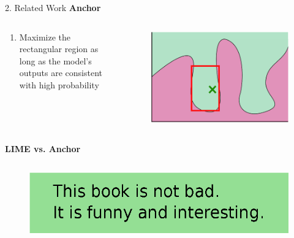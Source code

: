 \documentclass[unicode]{beamer}
\begin{document}
\begin{frame}
\begin{columns}[t]
\begin{column}{\lcol\linewidth}
\begin{block}{2. Related Work}
				\vspace{1.0em}
				\hspace{-1.0em}
				\textbf{Anchor}\cite{ribeiro2018anchors}
				\vspace{-0.5em}
				\begin{columns}
					\begin{column}{.55\textwidth}
						{
							\renewcommand{\leftmargini}{2.5em}
							\begin{enumerate}
								\item Maximize the rectangular region as long as
								      the model’s outputs are consistent with high probability
							\end{enumerate}
						}
					\end{column}
					\begin{column}{.45\textwidth}
						\begin{figure}
							\centering
							\includegraphics[width=.8\textwidth]{src/img/visual-anchor}
						\end{figure}
					\end{column}
				\end{columns}
				\vspace{1.0em}
				\hspace{-1.0em}
				\textbf{LIME vs. Anchor}
				\vspace{0.5em}
				\begin{columns}[]
					\begin{column}{0.4\textwidth}
						\begin{figure}
							\includegraphics[width=\textwidth]{src/img/example-instance}

\end{figure}
\end{column}
\end{columns}
\end{block}
\end{column}
\end{columns}
\end{frame}
\end{document}
